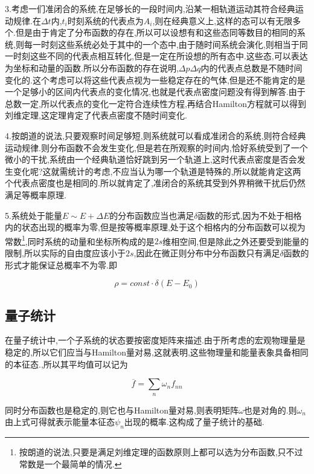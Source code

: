 3.考虑一们准闭合的系统,在足够长的一段时间内,沿某一相轨道运动其符合经典运动规律.在$\Delta t$内,$t_i$时刻系统的代表点为$A_i$,则在经典意义上,这样的态可以有无限多个.但是由于肯定了分布函数的存在,所以可以设想有和这些态同等数目的相同的系统,则每一时刻这些系统必处于其中的一个态中,由于随时间系统会演化,则相当于同一时刻这些不同的代表点相互转化,但是一定在所设想的所有态中.这些态,可以表达为坐标和动量的函数.所以分布函数的存在说明,$\Delta p\Delta q$内的代表点总数是不随时间变化的.这个考虑可以将这些代表点视为一些稳定存在的气体,但是还不能肯定的是一个足够小的区间内代表点的变化情况,也就是代表点密度问题没有得到解答.由于总数一定,所以代表点的变化一定符合连续性方程,再结合Hamilton方程就可以得到刘维定理,这定理肯定了代表点密度不随时间变化.

4.按朗道的说法,只要观察时间足够短,则系统就可以看成准闭合的系统,则符合经典运动规律.则分布函数不会发生变化,但是若在所观察的时间内,恰好系统受到了一个微小的干扰,系统由一个经典轨道恰好跳到另一个轨道上,这时代表点密度是否会发生变化呢?这就需统计的考虑,不应当认为哪一个轨道是特殊的,所以就能肯定这两个代表点密度也是相同的.所以就肯定了,准闭合的系统其受到外界稍微干扰后仍然满足等概率原理.

5.系统处于能量$E\sim E+\Delta E$的分布函数应当也满足$\delta$函数的形式,因为不处于相格内的状态出现的概率为零,但是按等概率原理,处于这个相格内的分布函数可以视为常数\footnote{按朗道的说法,只要是满足刘维定理的函数原则上都可以选为分布函数,只不过常数是一个最简单的情况.},同时系统的动量和坐标所构成的是$2s$维相空间,但是除此之外还要受到能量的限制,所以实际的自由度应该小于$2s$,因此在微正则分布中分布函数只有满足$\delta$函数的形式才能保证总概率不为零.即

\begin{equation}
  \rho =const \cdot \delta(E-E_0)
\end{equation}

\subsection{量子统计}

在量子统计中,一个子系统的状态要按密度矩阵来描述.由于所考虑的宏观物理量是稳定的,所以它们应当与Hamilton量对易,这就表明,这些物理量和能量表象具备相同的本征态.,所以其平均值可以记为

\begin{equation}
  \overline{f}=\sum_n \omega_nf_{nn}
\end{equation}

同时分布函数也是稳定的,则它也与Hamilton量对易,则表明矩阵$\omega$也是对角的.则$\omega_n$由上式可得就表示能量本征态$\psi_n$出现的概率.这构成了量子统计的基础.

